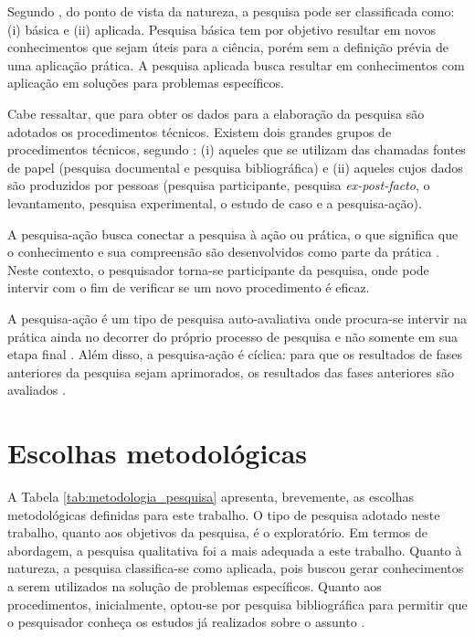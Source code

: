 Segundo , do ponto de vista da natureza, a pesquisa pode ser classificada como: (i) básica e (ii) aplicada. Pesquisa básica tem por objetivo resultar em novos conhecimentos que sejam úteis para a ciência, porém sem a definição prévia de uma aplicação prática. A pesquisa aplicada busca resultar em conhecimentos com aplicação em soluções para problemas específicos. 

Cabe ressaltar, que para obter os dados para a elaboração da pesquisa são adotados os procedimentos técnicos. Existem dois grandes grupos de procedimentos técnicos, segundo :
(i) aqueles que se utilizam das chamadas fontes de papel (pesquisa documental e pesquisa bibliográfica) e (ii) aqueles cujos dados são produzidos por pessoas (pesquisa participante, pesquisa \textit{ex-post-facto}, o levantamento, pesquisa experimental, o estudo de caso e a pesquisa-ação).

A pesquisa-ação busca conectar a pesquisa à ação ou prática, o que significa que o conhecimento e sua compreensão são desenvolvidos como parte da prática \cite{engel2000pesquisa}. Neste contexto, o pesquisador torna-se participante da pesquisa, onde pode intervir com o fim de verificar se um novo procedimento é eficaz. 

A pesquisa-ação é um tipo de pesquisa auto-avaliativa onde procura-se intervir na prática ainda no decorrer do próprio processo de pesquisa e não somente em sua etapa final \cite{engel2000pesquisa}. Além disso, a pesquisa-ação é cíclica: para que os resultados de fases anteriores da pesquisa sejam aprimorados, os resultados das fases anteriores são avaliados \cite{engel2000pesquisa}.




\section{Escolhas metodológicas}\label{sec:escolhas_metodologicas}


A Tabela \ref{tab:metodologia_pesquisa} apresenta, brevemente, as escolhas metodológicas definidas para este trabalho. O tipo de pesquisa adotado neste trabalho, quanto aos objetivos da pesquisa, é o exploratório. Em termos de abordagem, a pesquisa qualitativa foi a mais adequada a este trabalho. Quanto à natureza, a pesquisa classifica-se como aplicada, pois buscou gerar conhecimentos a serem utilizados na solução de problemas específicos. Quanto aos procedimentos, inicialmente, optou-se por pesquisa bibliográfica para permitir que o pesquisador conheça os estudos já realizados sobre o assunto \cite[pág. 31]{fonseca}. 



